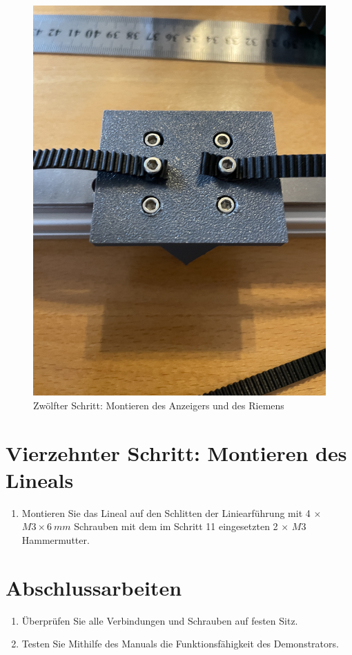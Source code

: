 \begin{figure}[H]
	\begin{center}
		\includegraphics[width=\textwidth]{Images/13Schr.jpg}
		\caption{Zwölfter Schritt: Montieren des Anzeigers und des Riemens} \label{13.S}
	\end{center}
\end{figure}


\section{Vierzehnter Schritt: Montieren des Lineals}

\begin{enumerate}
	\item Montieren Sie das Lineal auf den Schlitten der Liniearführung mit 4 $\times$ $ M3 \times 6 \ mm $ Schrauben mit dem im Schritt 11 eingesetzten 2 $\times$ $ M3 $ Hammermutter.
\end{enumerate}


\section{Abschlussarbeiten}

\begin{enumerate}
	\item Überprüfen Sie alle Verbindungen und Schrauben auf festen Sitz.
	\item Testen Sie Mithilfe des Manuals die Funktionsfähigkeit des Demonstrators. 
\end{enumerate}
